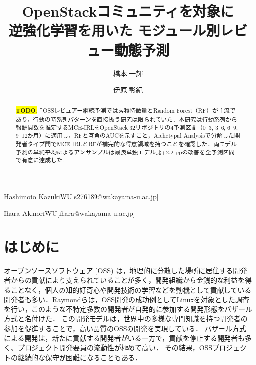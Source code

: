 \documentclass[submit,noauthor,ses,dvipdfmx]{ipsj}
\newcommand{\todo}[1]{\colorbox{yellow}{{\bf TODO}:}{\color{red} {\textbf{[#1]}}}}
\begin{document}
\raggedbottom


\title{OpenStackコミュニティを対象に\\逆強化学習を用いた
モジュール別レビュー動態予測}




\author{橋本  一輝}{Hashimoto Kazuki}{WU}[s276189@wakayama-u.ac.jp]
\author{伊原  彰紀}{Ihara Akinori}{WU}[ihara@wakayama-u.ac.jp]

\begin{abstract}
\todo{}OSSレビュアー継続予測では累積特徴量とRandom Forest（RF）が主流であり，行動の時系列パターンを直接扱う研究は限られていた．本研究は行動系列から報酬関数を推定するMCE-IRLをOpenStack 32リポジトリの4予測区間（0--3, 3--6, 6--9, 9--12か月）に適用し，RFと互角のAUCを示すこと，Archetypal Analysisで分解した開発者タイプ間でMCE-IRLとRFが補完的な得意領域を持つことを確認した．両モデル予測の単純平均によるアンサンブルは最良単独モデル比$+2.2$ ppの改善を全予測区間で有意に達成した．
\end{abstract}

\maketitle
\section{はじめに}\label{sec:Introduction}
オープンソースソフトウェア (OSS) は，地理的に分散した場所に居住する開発者からの貢献により支えられていることが多く，開発組織から金銭的な利益を得ることなく，個人の知的好奇心や開発技術の学習などを動機として貢献している開発者も多い\cite{motivation}．Raymondらは，OSS開発の成功例としてLinuxを対象とした調査を行い，このような不特定多数の開発者が自発的に参加する開発形態をバザール方式と名付けた\cite{bazzar}．
この開発モデルは，世界中の多様な専門知識を持つ開発者の参加を促進することで，高い品質のOSSの開発を実現している．
バザール方式による開発は，新たに貢献する開発者がいる一方で，貢献を停止する開発者も多く、プロジェクト開発要員の流動性が極めて高い\cite{dynamics}．%
その結果，OSSプロジェクトの継続的な保守が困難になることもある\cite{pinto_otc}．
\end{document}
